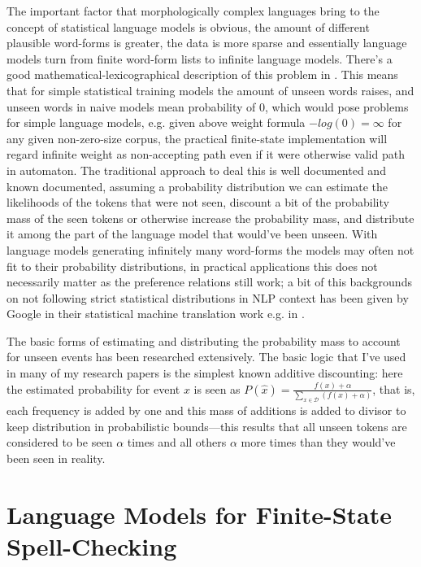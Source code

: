 \documentclass[officiallayout,draft]{unihelcompling}
\begin{document}
The important factor that morphologically complex languages bring to the
concept of statistical language models is obvious, the amount of different
plausible word-forms is greater, the data is more sparse and essentially
language models turn from finite word-form lists to infinite language models.
There's a good mathematical-lexicographical description of this problem in
\cite{kornai2000many}. This means that for simple statistical training models
the amount of unseen words raises, and unseen words in naive models mean
probability of $0$, which would pose problems for simple language models,
e.g. given above weight formula $-log(0) = \infty$ for any given non-zero-size
corpus, the practical finite-state implementation will regard infinite weight
as non-accepting path even if it were otherwise valid path in automaton. The
traditional approach to deal this is well documented and known documented,
assuming a probability distribution we can estimate the likelihoods of the
tokens that were not seen, discount a bit of the probability mass of the seen
tokens or otherwise increase the probability mass, and distribute it among
the part of the language model that would've been unseen. With language models
generating infinitely many word-forms the models may often not fit to their
probability distributions, in practical applications this does not necessarily
matter as the preference relations still work; a bit of this backgrounds on not
following strict statistical distributions in NLP context has been given by
Google in their statistical machine translation work e.g. in \cite{brants}.

The basic forms of estimating and distributing the probability mass to account
for unseen events has been researched extensively. The basic logic that I've
used in many of my research papers is the simplest known additive discounting:
here the estimated probability for event $x$ is seen as 
$P(\hat{x}) = \frac{f(x) + \alpha}{\sum_{x \in \mathcal{D}}(f(x) + \alpha)}$,
that is, each frequency is added by one and this mass of additions is added to
divisor to keep distribution in probabilistic bounds---this results that all
unseen tokens are considered to be seen $\alpha$ times and all others $\alpha$
more times than they would've been seen in reality. 



\chapter{Language Models for Finite-State Spell-Checking}
\label{chap:language-models}
\end{document}
